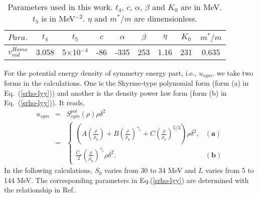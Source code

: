 \documentclass[reprint,aps,prc,twocolumn,superscriptaddress]{revtex4-1}
\begin{document}
\begin{table}[htbp]%
\caption{\label{tab:table1}%
Parameters used in this work.  $t_4$, $c$, $\alpha$, $\beta$ and $K_0$ are in MeV. $t_5$ is in MeV$^{-2}$. $\eta$ and $m^*/m$ are dimensionless.}
\begin{tabular}{lcccccccc}
\hline
\hline
$Para.$ & $t_4$ & $t_5$ & $c$ &$\alpha$ & $\beta$ & $\eta$  & $K_0$ & $m^*/m$\\
\hline
$v_{md}^{Hama}$ & 3.058 & 5$\times$10$^{-4}$ & -86  &-335 & 253 & 1.16  & 231 & 0.635 \\
\hline
\hline
\end{tabular}
\end{table}

For the potential energy density of symmetry energy part, i.e., $u_{sym}$, we take two forms in the calculations. One is the Skyrme-type polynomial form (form (a) in Eq.~(\ref{srho-lyy})) and another is the density power law form (form (b) in Eq.~(\ref{srho-lyy})). It reads,
\begin{eqnarray}
\label{srho-lyy}
 u_{sym}&=&S^{pot}_{sym}(\rho)\rho\delta^2\\\nonumber
 &=&\left\{
 \begin{array}{ll}
    ( A(\frac{\rho}{\rho_0})+B(\frac{\rho}{\rho_0})^{\gamma_s}+C(\frac{\rho}{\rho_0})^{5/3} )\rho\delta^{2}, & \mathbf{(a)}\\
    \frac{C_{s}}{2}(\frac{\rho}{\rho_{0}})^{\gamma_i}\rho\delta^2. & \mathbf{(b)}
  \end{array}
\right.
\end{eqnarray}
In the following calculations, $S_0$ varies from 30 to 34 MeV and $L$ varies from 5 to 144 MeV. The corresponding parameters in Eq.(\ref{srho-lyy}) are determined with the relationship in Ref.\cite{YXZhang2020PRC,Zhang2020FOP}.
\end{document}
